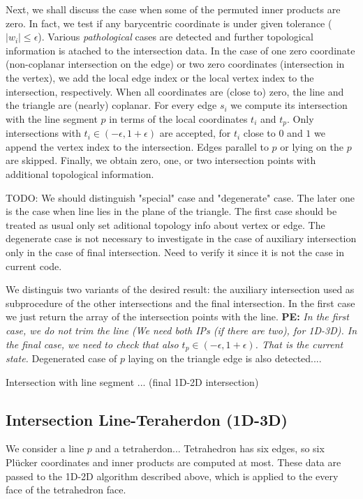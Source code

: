 \documentclass{elsarticle}
\def\abs#1{\left|#1\right|}
\def\abs#1{| #1 |}
\newcommand{\notePE}[1]{{\color{Orange} \textbf{PE: } \textit{#1}}}
\newcommand{\plucker}{Pl\"{u}cker }
\begin{document}
Next, we shall discuss the case when some of the permuted inner products are zero. In fact, we test if any barycentric coordinate is under given tolerance 
($\abs{w_i} \le \epsilon$). Various \emph{pathological} cases are detected and further topological 
information is atached to the intersection data.  In the case of one zero coordinate (non-coplanar intersection on the edge)
or two zero coordinates (intersection in the vertex), we add the local edge index or the local vertex index to the intersection, respectively.
When all coordinates are (close to) zero, the line and the triangle are (nearly) coplanar. For every edge $s_i$ we compute
its intersection with the line segment $p$ in terms of the local coordinates $t_i$ and $t_p$. Only intersections with $t_i \in (-\epsilon, 1+\epsilon)$
are accepted, for $t_i$ close to $0$ and $1$ we append the vertex index to the intersection. Edges parallel to $p$ or lying on the $p$ are skipped.
Finally, we obtain zero, one, or two intersection points with additional topological information.


TODO:
We should distinguish "special" case and "degenerate" case. The later one is the case when line lies in the plane of the triangle. The first case should be
treated as usual only set aditional topology info about vertex or edge. The degenerate case is not necessary to investigate in the case of auxiliary
intersection only in the case of final intersection. Need to verify it since it is not the case in current code.


We distinguis two variants of the desired result: the auxiliary intersection used as subprocedure of the other intersections and the final intersection.
In the first case we just return the array of the intersection points with the line.
\notePE{In the first case, we do not trim the line (We need both IPs (if there are two), for 1D-3D). In the final case, we need to check that also $t_p \in (-\epsilon, 1+\epsilon)$. That is the current state.}
 Degenerated case of $p$ laying on the triangle edge is also detected....

Intersection with line segment ... (final 1D-2D intersection)

\subsection{Intersection Line-Teraherdon (1D-3D)}
We consider a line $p$ and a tetraherdon...
Tetrahedron has six edges, so six \plucker coordinates and inner products are computed at most. These data are
passed to the 1D-2D algorithm described above, which is applied to the every face of the tetrahedron face. 
\end{document}
